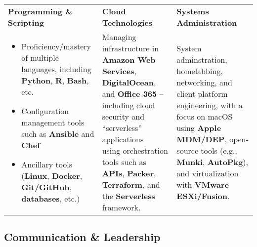 \documentclass[10pt]{article}
\newcommand{\afterlistspace}[0]{\vspace{-1.5em}}
\begin{document}
\begin{tabularx}{\linewidth}{
    >{\hsize=1\hsize}X|%
    >{\hsize=1\hsize}X|%
    >{\hsize=1\hsize}X%
  }
    \textbf{Programming \& Scripting}
    & \textbf{Cloud Technologies}
    & \textbf{Systems Administration}
    \\
    \begin{itemize}[noitemsep,topsep=0pt]
        \vspace{-0.75em}

        \item Proficiency/mastery of multiple languages, including \textbf{Python}, \textbf{R}, \textbf{Bash}, %
        etc.

        \item Configuration management tools such as \textbf{Ansible} and \textbf{Chef}

        \item Ancillary tools (\textbf{Linux}, \textbf{Docker}, \textbf{Git/GitHub}, \textbf{databases}, etc.)
        
        \afterlistspace
    \end{itemize}

    & Managing infrastructure in \textbf{Amazon Web Services}, \textbf{DigitalOcean}, and \textbf{Office 365} -- including cloud security and ``serverless'' applications -- using orchestration tools such as \textbf{APIs}, \textbf{Packer}, \textbf{Terraform}, and the \textbf{Serverless} framework.

    & %

    System adminstration, homelabbing, networking, and client platform engineering, with a focus on macOS using \textbf{Apple MDM/DEP}, open-source tools (e.g., \textbf{Munki}, \textbf{AutoPkg}), and virtualization with \textbf{VMware ESXi/Fusion}.
    
\end{tabularx}


\subsection{Communication \& Leadership}
\end{document}
